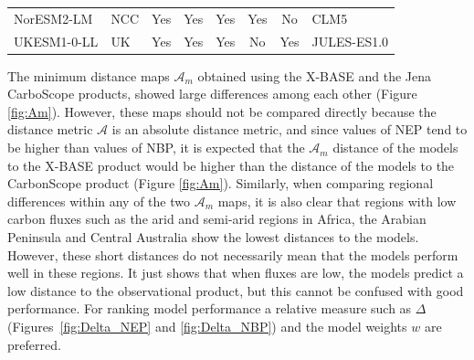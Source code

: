 \documentclass[gmd, manuscript]{copernicus}
\begin{document}
\begin{table}[t]
\begin{tabular}{llcccccl}
NorESM2-LM                                                             & NCC                                                                  & Yes                              & Yes                              & Yes                                                      & Yes                                                      & No                                                                                         & CLM5                                                                 \\
UKESM1-0-LL                                                            & UK                                                                   & Yes                              & Yes                              & Yes                                                      & No                                                       & Yes                                                                                        & JULES-ES1.0                                                          \\ 
\bottomrule
\end{tabular}
\end{table}

The minimum distance maps $\mathcal{A}_m$ obtained using the X-BASE and the Jena CarboScope products, showed large differences among each other (Figure \ref{fig:Am}). However, these maps should not be compared directly because the distance metric $\mathcal{A}$ is an absolute distance metric, and since values of NEP tend to be higher than values of NBP, it is expected that the $\mathcal{A}_m$ distance of the models to the X-BASE product would be higher than the distance of the models to the CarbonScope product (Figure \ref{fig:Am}). 
Similarly, when comparing regional differences within any of the two $\mathcal{A}_m$ maps, it is also clear that regions with low carbon fluxes such as the arid and semi-arid regions in Africa, the Arabian Peninsula and Central Australia show the lowest distances to the models. However, these short distances do not necessarily mean that the models perform well in these regions. It just shows that when fluxes are low, the models predict a low distance to the observational product, but this cannot be confused with good performance. 
For ranking model performance a relative measure such as $\Delta$ (Figures~\ref{fig:Delta_NEP} and \ref{fig:Delta_NBP}) and the model weights $w$ are preferred.
\end{document}
